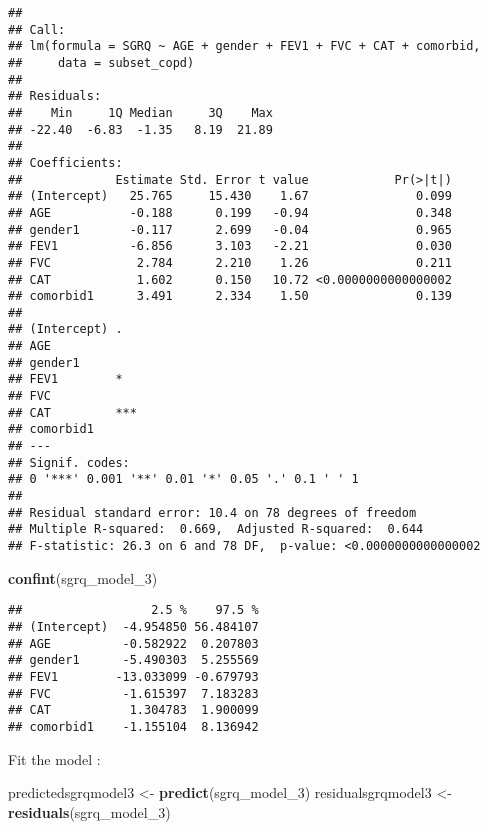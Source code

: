 \documentclass[
]{article}
\newenvironment{Shaded}{\begin{snugshade}}{\end{snugshade}}
\newcommand{\FunctionTok}[1]{\textcolor[rgb]{0.13,0.29,0.53}{\textbf{#1}}}
\newcommand{\NormalTok}[1]{#1}
\newcommand{\OtherTok}[1]{\textcolor[rgb]{0.56,0.35,0.01}{#1}}
\begin{document}
\begin{verbatim}
## 
## Call:
## lm(formula = SGRQ ~ AGE + gender + FEV1 + FVC + CAT + comorbid, 
##     data = subset_copd)
## 
## Residuals:
##    Min     1Q Median     3Q    Max 
## -22.40  -6.83  -1.35   8.19  21.89 
## 
## Coefficients:
##             Estimate Std. Error t value            Pr(>|t|)
## (Intercept)   25.765     15.430    1.67               0.099
## AGE           -0.188      0.199   -0.94               0.348
## gender1       -0.117      2.699   -0.04               0.965
## FEV1          -6.856      3.103   -2.21               0.030
## FVC            2.784      2.210    1.26               0.211
## CAT            1.602      0.150   10.72 <0.0000000000000002
## comorbid1      3.491      2.334    1.50               0.139
##                
## (Intercept) .  
## AGE            
## gender1        
## FEV1        *  
## FVC            
## CAT         ***
## comorbid1      
## ---
## Signif. codes:  
## 0 '***' 0.001 '**' 0.01 '*' 0.05 '.' 0.1 ' ' 1
## 
## Residual standard error: 10.4 on 78 degrees of freedom
## Multiple R-squared:  0.669,  Adjusted R-squared:  0.644 
## F-statistic: 26.3 on 6 and 78 DF,  p-value: <0.0000000000000002
\end{verbatim}

\begin{Shaded}
\begin{Highlighting}[]
\FunctionTok{confint}\NormalTok{(sgrq\_model\_3)}
\end{Highlighting}
\end{Shaded}

\begin{verbatim}
##                  2.5 %    97.5 %
## (Intercept)  -4.954850 56.484107
## AGE          -0.582922  0.207803
## gender1      -5.490303  5.255569
## FEV1        -13.033099 -0.679793
## FVC          -1.615397  7.183283
## CAT           1.304783  1.900099
## comorbid1    -1.155104  8.136942
\end{verbatim}

Fit the model :

\begin{Shaded}
\begin{Highlighting}[]
\NormalTok{predictedsgrqmodel3 }\OtherTok{\textless{}{-}} \FunctionTok{predict}\NormalTok{(sgrq\_model\_3)}
\NormalTok{residualsgrqmodel3 }\OtherTok{\textless{}{-}} \FunctionTok{residuals}\NormalTok{(sgrq\_model\_3)}
\end{Highlighting}
\end{Shaded}
\end{document}
